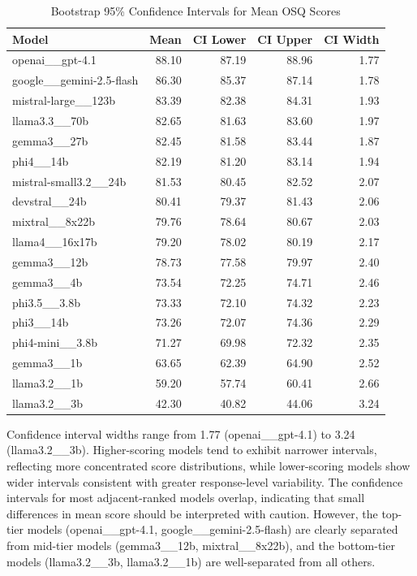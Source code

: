 \begin{table}[htbp]
\centering
\caption{Bootstrap 95\% Confidence Intervals for Mean OSQ Scores}
\label{tab:osq_bootstrap_mirror}
\begin{tabular}{lrrrr}
\toprule
Model & Mean & CI Lower & CI Upper & CI Width \\
\midrule
openai\_\_gpt-4.1               & 88.10 & 87.19 & 88.96 & 1.77 \\
google\_\_gemini-2.5-flash       & 86.30 & 85.37 & 87.14 & 1.78 \\
mistral-large\_\_123b            & 83.39 & 82.38 & 84.31 & 1.93 \\
llama3.3\_\_70b                  & 82.65 & 81.63 & 83.60 & 1.97 \\
gemma3\_\_27b                    & 82.45 & 81.58 & 83.44 & 1.87 \\
phi4\_\_14b                      & 82.19 & 81.20 & 83.14 & 1.94 \\
mistral-small3.2\_\_24b          & 81.53 & 80.45 & 82.52 & 2.07 \\
devstral\_\_24b                  & 80.41 & 79.37 & 81.43 & 2.06 \\
mixtral\_\_8x22b                 & 79.76 & 78.64 & 80.67 & 2.03 \\
llama4\_\_16x17b                 & 79.20 & 78.02 & 80.19 & 2.17 \\
gemma3\_\_12b                    & 78.73 & 77.58 & 79.97 & 2.40 \\
gemma3\_\_4b                     & 73.54 & 72.25 & 74.71 & 2.46 \\
phi3.5\_\_3.8b                   & 73.33 & 72.10 & 74.32 & 2.23 \\
phi3\_\_14b                      & 73.26 & 72.07 & 74.36 & 2.29 \\
phi4-mini\_\_3.8b                & 71.27 & 69.98 & 72.32 & 2.35 \\
gemma3\_\_1b                     & 63.65 & 62.39 & 64.90 & 2.52 \\
llama3.2\_\_1b                   & 59.20 & 57.74 & 60.41 & 2.66 \\
llama3.2\_\_3b                   & 42.30 & 40.82 & 44.06 & 3.24 \\
\bottomrule
\end{tabular}
\end{table}

Confidence interval widths range from 1.77 (openai\_\_gpt-4.1) to 3.24 (llama3.2\_\_3b). Higher-scoring models tend to exhibit narrower intervals, reflecting more concentrated score distributions, while lower-scoring models show wider intervals consistent with greater response-level variability. The confidence intervals for most adjacent-ranked models overlap, indicating that small differences in mean score should be interpreted with caution. However, the top-tier models (openai\_\_gpt-4.1, google\_\_gemini-2.5-flash) are clearly separated from mid-tier models (gemma3\_\_12b, mixtral\_\_8x22b), and the bottom-tier models (llama3.2\_\_3b, llama3.2\_\_1b) are well-separated from all others.

